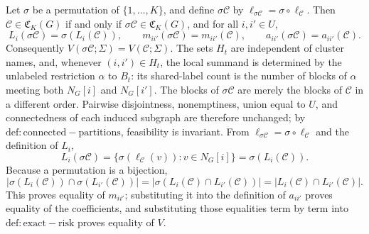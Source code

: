 Let \(\sigma\) be a permutation of \(\{1,\ldots,K\}\), and define \(\sigma\mathcal C\) by \(\ell_{\sigma\mathcal C}=\sigma\circ\ell_{\mathcal C}\).  Then \(\mathcal C\in\mathfrak C_K(G)\) if and only if \(\sigma\mathcal C\in\mathfrak C_K(G)\), and for all \(i,i'\in U\),
\[
 L_i(\sigma\mathcal C)=\sigma(L_i(\mathcal C)),\qquad
 m_{ii'}(\sigma\mathcal C)=m_{ii'}(\mathcal C),\qquad
 a_{ii'}(\sigma\mathcal C)=a_{ii'}(\mathcal C).
\]
Consequently \(V(\sigma\mathcal C;\Sigma)=V(\mathcal C;\Sigma)\).  The sets \(H_t\) are independent of cluster names, and, whenever \((i,i')\in H_t\), the local summand is determined by the unlabeled restriction \(\alpha\) to \(B_t\): its shared-label count is the number of blocks of \(\alpha\) meeting both \(N_G[i]\) and \(N_G[i']\).
The blocks of \(\sigma\mathcal C\) are merely the blocks of \(\mathcal C\) in a different order.  Pairwise disjointness, nonemptiness, union equal to \(U\), and connectedness of each induced subgraph are therefore unchanged; by \(\mathrm{def:connected-partitions}\), feasibility is invariant.  From \(\ell_{\sigma\mathcal C}=\sigma\circ\ell_{\mathcal C}\) and the definition of \(L_i\),
\[
 L_i(\sigma\mathcal C)
 =\{\sigma(\ell_{\mathcal C}(v)):v\in N_G[i]\}
 =\sigma(L_i(\mathcal C)).
\]
Because a permutation is a bijection,
\[
 |\sigma(L_i(\mathcal C))\cap\sigma(L_{i'}(\mathcal C))|
 =|\sigma(L_i(\mathcal C)\cap L_{i'}(\mathcal C))|
 =|L_i(\mathcal C)\cap L_{i'}(\mathcal C)|.
\]
This proves equality of \(m_{ii'}\); substituting it into the definition of \(a_{ii'}\) proves equality of the coefficients, and substituting those equalities term by term into \(\mathrm{def:exact-risk}\) proves equality of \(V\).

